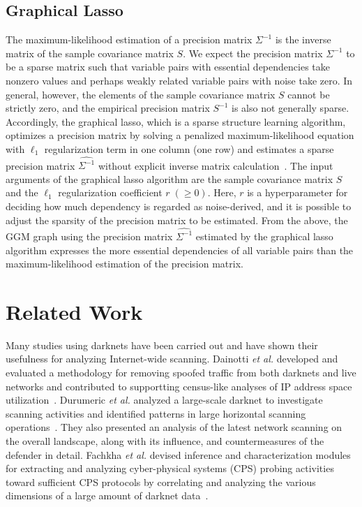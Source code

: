 \documentclass[conference]{IEEEtran}
\begin{document}
\subsection{Graphical Lasso}
The maximum-likelihood estimation of a precision matrix $\Sigma^{-1}$ is the inverse matrix of the sample covariance matrix $S$.
We expect the precision matrix $\Sigma^{-1}$ to be a sparse matrix such that variable pairs with essential dependencies take nonzero values and perhaps weakly related variable pairs with noise take zero.
In general, however, the elements of the sample covariance matrix $S$ cannot be strictly zero, and the empirical precision matrix $S^{-1}$ is also not generally sparse.
Accordingly, the graphical lasso, which is a sparse structure learning algorithm, optimizes a precision matrix by solving a penalized maximum-likelihood equation with $\ell_1$ regularization term in one column (one row) and estimates a sparse precision matrix $\hat{\Sigma^{-1}}$ without explicit inverse matrix calculation~\cite{Friedman}.
The input arguments of the graphical lasso algorithm are the sample covariance matrix $S$ and the $\ell_1$ regularization coefficient $r\;(\geq 0)$.
Here, $r$ is a hyperparameter for deciding how much dependency is regarded as noise-derived, and it is possible to adjust the sparsity of the precision matrix to be estimated.
From the above, the GGM graph using the precision matrix $\hat{\Sigma^{-1}}$ estimated by the graphical lasso algorithm expresses the more essential dependencies of all variable pairs than the maximum-likelihood estimation of the precision matrix.



\section{Related Work}
Many studies using darknets have been carried out and have shown their usefulness for analyzing Internet-wide scanning.
Dainotti {\it et al.} developed and evaluated a methodology for removing spoofed traffic from both darknets and live networks and contributed to supportting census-like analyses of IP address space utilization~\cite{Dainotti}.
Durumeric {\it et al.} analyzed a large-scale darknet to investigate scanning activities and identified patterns in large horizontal scanning operations~\cite{Durumeric}.
They also presented an analysis of the latest network scanning on the overall landscape, along with its influence, and countermeasures of the defender in detail.
Fachkha {\it et al.} devised inference and characterization modules for extracting and analyzing cyber-physical systems (CPS) probing activities toward sufficient CPS protocols by correlating and analyzing the various dimensions of a large amount of darknet data~\cite{Fachkha}.
\end{document}
